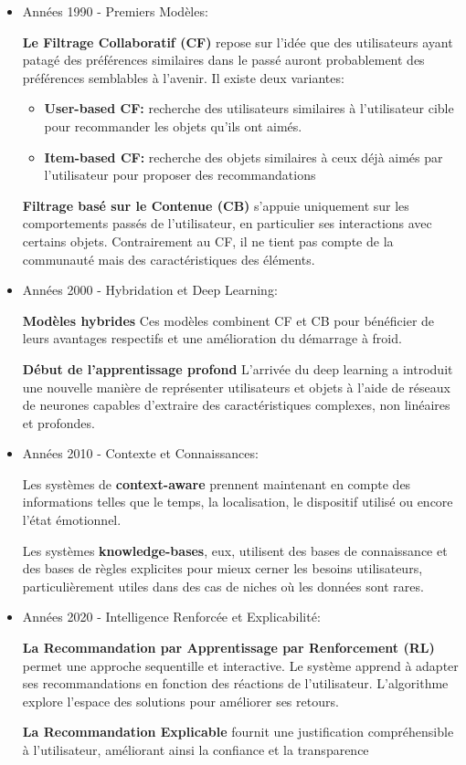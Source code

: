 \documentclass{article}
\begin{document}
\begin{itemize}
    \item Années 1990 - Premiers Modèles:

          \textbf{Le Filtrage Collaboratif (CF)} repose sur l'idée que des utilisateurs ayant patagé des préférences similaires dans le passé auront probablement des préférences semblables à l'avenir. Il existe deux variantes:
          \begin{itemize}
              \item \textbf{User-based CF: }recherche des utilisateurs similaires à l'utilisateur cible pour recommander les objets qu'ils ont aimés.
              \item \textbf{Item-based CF: }recherche des objets similaires à ceux déjà aimés par l'utilisateur pour proposer des recommandations
          \end{itemize}
          \textbf{Filtrage basé sur le Contenue (CB)} s'appuie uniquement sur les comportements passés de l'utilisateur, en particulier ses interactions avec certains objets. Contrairement au CF, il ne tient pas compte de la communauté mais des caractéristiques des éléments.
          \newline

    \item Années 2000 - Hybridation et Deep Learning:

          \textbf{Modèles hybrides} Ces modèles combinent CF et CB pour bénéficier de leurs avantages respectifs et une amélioration du démarrage à froid.

          \textbf{Début de l'apprentissage profond} L'arrivée du deep learning a introduit une nouvelle manière de représenter utilisateurs et objets à l'aide de réseaux de neurones capables d'extraire des caractéristiques complexes, non linéaires et profondes.
          \newline
    \item Années 2010 - Contexte et Connaissances:

          Les systèmes de \textbf{context-aware} prennent maintenant en compte des informations telles que le temps, la localisation, le dispositif utilisé ou encore l'état émotionnel.

          Les systèmes \textbf{knowledge-bases}, eux, utilisent des bases de connaissance et des bases de règles explicites pour mieux cerner les besoins utilisateurs, particulièrement utiles dans des cas de niches où les données sont rares.
          \newline
    \item Années 2020 - Intelligence Renforcée et Explicabilité:

          \textbf{La Recommandation par Apprentissage par Renforcement (RL)} permet une approche sequentille et interactive. Le système apprend à adapter ses recommandations en fonction des réactions de l'utilisateur. L'algorithme explore l'espace des solutions pour améliorer ses retours.

          \textbf{La Recommandation Explicable} fournit une justification compréhensible à l'utilisateur, améliorant ainsi la confiance et la transparence
\end{itemize}
\end{document}

